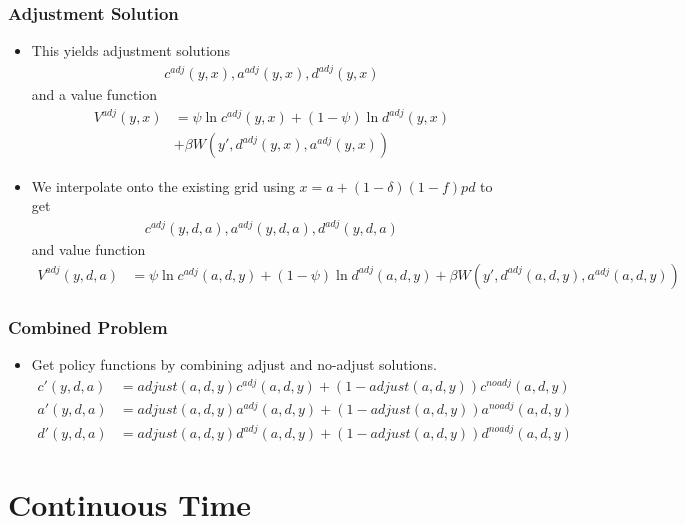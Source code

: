 \documentclass[english,xcolor=svgnames]{beamer}
\begin{document}
\begin{frame}
    \frametitle{Adjustment Solution}
    \begin{itemize}
        \item This yields adjustment solutions
        \begin{align*}
            c^{adj}(y,x), a^{adj}(y,x), d^{adj}(y,x)
        \end{align*}
        and a value function
        \begin{align*}
            V^{adj}(y,x) &= \psi \ln c^{adj}(y,x) +(1-\psi) \ln d^{adj}(y,x) \\
            &+ \beta W(y',d^{adj}(y,x),a^{adj}(y,x)) 
        \end{align*}
        \item We interpolate onto the existing grid using $x=a+(1-\delta)(1-f)pd$ to get
        \begin{align*}
            c^{adj}(y,d,a), a^{adj}(y,d,a), d^{adj}(y,d,a)
        \end{align*}
        and value function
        \begin{align*}
            V^{adj}(y,d,a) &= \psi \ln c^{adj}(a,d,y) +(1-\psi) \ln d^{adj}(a,d,y) + \beta W(y',d^{adj}(a,d,y),a^{adj}(a,d,y)) 
        \end{align*}
    \end{itemize}
\end{frame}



\begin{frame}
    \frametitle{Combined Problem}
    \begin{itemize}
        \item Get policy functions by combining adjust and no-adjust solutions.
        \begin{align*}
            c'(y,d,a) &= adjust(a,d,y)c^{adj}(a,d,y) + (1-adjust(a,d,y))c^{noadj}(a,d,y) \\
            a'(y,d,a) &= adjust(a,d,y)a^{adj}(a,d,y) + (1-adjust(a,d,y))a^{noadj}(a,d,y) \\
            d'(y,d,a) &= adjust(a,d,y)d^{adj}(a,d,y) + (1-adjust(a,d,y))d^{noadj}(a,d,y) 
        \end{align*}
    \end{itemize}
\end{frame}
        

\section{Continuous Time}
\end{document}
